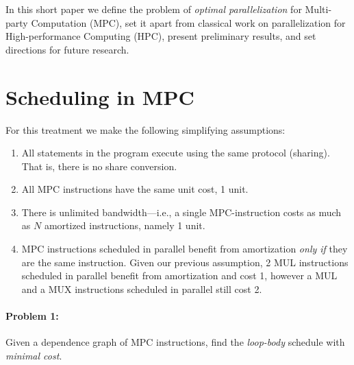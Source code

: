 \documentclass[sigconf, screen, natbib=false, dvipsnames, table]{acmart}
\theoremstyle{definition}
\begin{document}
In this short paper we define the problem of \emph{optimal parallelization} for Multi-party Computation (MPC), 
set it apart from classical work on parallelization for High-performance Computing (HPC), present preliminary 
results, and set directions for future research. 







\section{Scheduling in MPC}

For this treatment we make the following simplifying assumptions:

\begin{enumerate}
\item All statements in the program execute using the same protocol (sharing). That is, there is no share conversion.
\item All MPC instructions have the same unit cost, 1 unit.
\item There is unlimited bandwidth---i.e., a single MPC-instruction costs as much as $N$ amortized instructions, namely 1 unit.
\item MPC instructions scheduled in parallel benefit from amortization \emph{only if} they are the same instruction. Given our previous assumption, 
2 MUL instructions scheduled in parallel benefit from amortization and cost 1, however a MUL and a MUX instructions scheduled 
in parallel still cost 2.
\end{enumerate}

\paragraph{Problem 1:} Given a dependence graph of MPC instructions, find the \emph{loop-body} schedule 
with \emph{minimal cost}.
\end{document}
